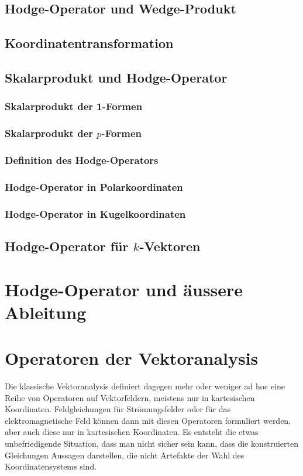 \subsection{Hodge-Operator und Wedge-Produkt}

\subsection{Koordinatentransformation}

\subsection{Skalarprodukt und Hodge-Operator}

\subsubsection{Skalarprodukt der 1-Formen}
\subsubsection{Skalarprodukt der $p$-Formen}
\subsubsection{Definition des Hodge-Operators}
\subsubsection{Hodge-Operator in Polarkoordinaten}
\subsubsection{Hodge-Operator in Kugelkoordinaten}

\subsection{Hodge-Operator für $k$-Vektoren}

%
%
\section{Hodge-Operator und äussere Ableitung}



%
%
\section{Operatoren der Vektoranalysis
\label{buch:hodge:section:vektoranlysis}}
Die klassische Vektoranalysis definiert dagegen mehr oder weniger
ad hoc eine Reihe von Operatoren auf Vektorfeldern, meistens nur
in kartesischen Koordinaten.
Feldgleichungen für Strömungsfelder oder für das elektromagnetische
Feld können dann mit diesen Operatoren formuliert werden, aber auch
diese nur in kartesischen Koordinaten.
Es entsteht die etwas unbefriedigende Situation, dass man nicht
sicher sein kann, dass die konstruierten Gleichungen Aussagen
darstellen, die nicht Artefakte der Wahl des Koordinatensystems
sind.

